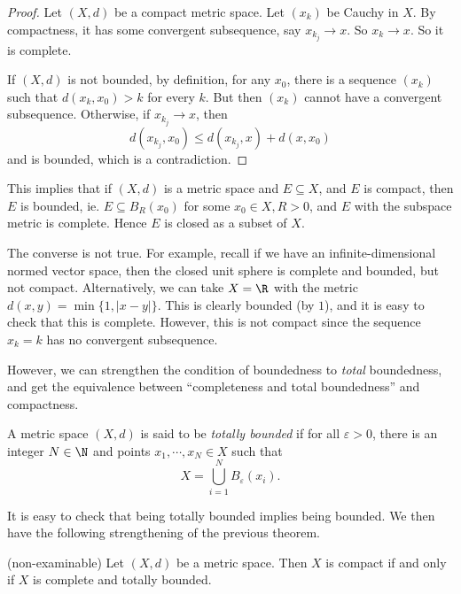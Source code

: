 \documentclass[a4paper]{article}
\begin{document}
\begin{proof}
  Let $(X, d)$ be a compact metric space. Let $(x_k)$ be Cauchy in $X$. By compactness, it has some convergent subsequence, say $x_{k_j} \to x$. So $x_k \to x$. So it is complete.

  If $(X, d)$ is not bounded, by definition, for any $x_0$, there is a sequence $(x_k)$ such that $d(x_k, x_0) > k$ for every $k$. But then $(x_k)$ cannot have a convergent subsequence. Otherwise, if $x_{k_j} \to x$, then
  \[
    d(x_{k_j}, x_0) \leq d(x_{k_j}, x) + d(x, x_0)
  \]
  and is bounded, which is a contradiction.
\end{proof}
This implies that if $(X, d)$ is a metric space and $E\subseteq X$, and $E$ is compact, then $E$ is bounded, ie. $E \subseteq B_R(x_0)$ for some $x_0 \in X, R > 0$, and $E$ with the subspace metric is complete. Hence $E$ is closed as a subset of $X$.

The converse is not true. For example, recall if we have an infinite-dimensional normed vector space, then the closed unit sphere is complete and bounded, but not compact. Alternatively, we can take $X = \R$ with the metric $d(x, y) = \min\{1, |x - y|\}$. This is clearly bounded (by $1$), and it is easy to check that this is complete. However, this is not compact since the sequence $x_k = k$ has no convergent subsequence.

However, we can strengthen the condition of boundedness to \emph{total} boundedness, and get the equivalence between ``completeness and total boundedness'' and compactness.

\begin{defi}
  A metric space $(X, d)$ is said to be \emph{totally bounded} if for all $\varepsilon > 0$, there is an integer $N \in \N$ and points $x_1, \cdots, x_N \in X$ such that
  \[
    X = \bigcup_{i = 1}^N B_\varepsilon (x_i).
  \]
\end{defi}
It is easy to check that being totally bounded implies being bounded. We then have the following strengthening of the previous theorem.
\begin{thm}(non-examinable)
  Let $(X, d)$ be a metric space. Then $X$ is compact if and only if $X$ is complete and totally bounded.
\end{thm}
\end{document}
